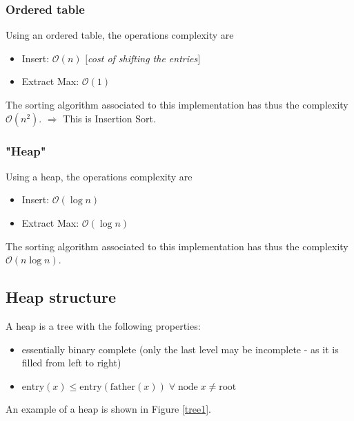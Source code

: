 \subsubsection{Ordered table} 
Using an ordered table, the operations complexity are \begin{itemize}
\item Insert: $\mathcal{O}(n)$ \textit{$[$cost of shifting the entries$]$}
\item Extract Max: $\mathcal{O}(1)$
\end{itemize}
The sorting algorithm associated to this implementation has thus the complexity $\mathcal{O} (n^2)$. \newline
$\Rightarrow$ This is Insertion Sort.

\subsubsection{"Heap"} Using a heap, the operations complexity are \begin{itemize}
\item Insert: $\mathcal{O}(\log n)$
\item Extract Max: $\mathcal{O}(\log n)$
\end{itemize}
The sorting algorithm associated to this implementation has thus the complexity $\mathcal{O} (n \log n)$.

\subsection{Heap structure}

A heap is a tree with the following properties:
\begin{itemize}
\item essentially binary complete (only the last level may be incomplete - as it is filled from left to right)
\item $\text{entry}(x) \leq \text{entry}(\text{father}(x)) \; \forall \; \text{node} \; x \neq \text{root}$
\end{itemize}
An example of a heap is shown in Figure \ref{tree1}.

